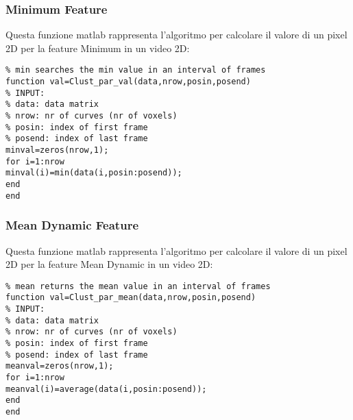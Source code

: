 \subsubsection{Minimum Feature}
\label{minimumcode}
Questa funzione matlab rappresenta l'algoritmo per calcolare il valore di un pixel 2D per la feature Minimum in un video 2D:
\begin{lstlisting}
% min searches the min value in an interval of frames 
function val=Clust_par_val(data,nrow,posin,posend)
% INPUT: 
% data: data matrix
% nrow: nr of curves (nr of voxels)
% posin: index of first frame
% posend: index of last frame
minval=zeros(nrow,1);
for i=1:nrow
minval(i)=min(data(i,posin:posend));
end
end
\end{lstlisting}
\subsubsection{Mean Dynamic Feature}
\label{meandynamiccode}
Questa funzione matlab rappresenta l'algoritmo per calcolare il valore di un pixel 2D per la feature Mean Dynamic in un video 2D:
\begin{lstlisting}
% mean returns the mean value in an interval of frames 
function val=Clust_par_mean(data,nrow,posin,posend)
% INPUT: 
% data: data matrix
% nrow: nr of curves (nr of voxels)
% posin: index of first frame
% posend: index of last frame
meanval=zeros(nrow,1);
for i=1:nrow
meanval(i)=average(data(i,posin:posend));
end
end
\end{lstlisting}